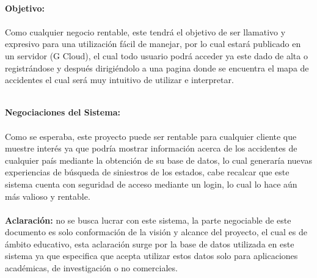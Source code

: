 \documentclass[40pt]{article}
\begin{document}
\maketitle
\textsf{\ \\
\textbf{Objetivo:} \\
\\
Como cualquier negocio rentable, este tendrá el objetivo de ser llamativo y expresivo para una utilización fácil de manejar, por lo cual estará publicado en un servidor (G Cloud), el cual todo usuario podrá acceder ya este dado de alta o registrándose y después dirigiéndolo a una pagina donde se encuentra el mapa de accidentes el cual será muy intuitivo de utilizar e interpretar. \\}

\maketitle
\textsf{\ \\
\textbf{Negociaciones del Sistema:} \\
\\
Como se esperaba, este proyecto puede ser rentable para cualquier cliente que muestre interés ya que podría mostrar información acerca de los accidentes de cualquier país mediante la obtención de su base de datos, lo cual generaría nuevas experiencias de búsqueda de siniestros de los estados, cabe recalcar que este sistema cuenta con seguridad de acceso mediante un login, lo cual lo hace aún más valioso y rentable.\\
\\
\textbf{Aclaración:} no se busca lucrar con este sistema, la parte negociable de este documento es solo conformación de la visión y alcance del proyecto, el cual es de ámbito educativo, esta aclaración surge por la base de datos utilizada en este sistema ya que especifica que acepta utilizar estos datos solo para aplicaciones académicas, de investigación o no comerciales. 
 \\}
\end{document}
